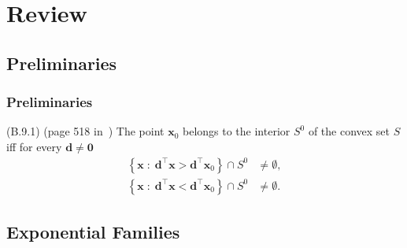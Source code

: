 \documentclass[serif,mathserif,professionalfont]{beamer}
\begin{document}
\section{Review}



\subsection{Preliminaries}



\begin{frame}
	
	\frametitle{Preliminaries}
	
	\begin{block}{(B.9.1) (page 518 in~\cite{BD2015})}
		The point $ \bm{x}_0 $ belongs to the interior $ S^0 $ of the convex set $ S $ iff for every $ \bm{d} \neq \bm{0} $
		\begin{equation*}
		\begin{split}
		\left\{\bm{x} \; : \; \bm{d}^\top \bm{x} > \bm{d}^\top \bm{x}_0 \right\} \cap S^0 & \neq \emptyset, \\
		\left\{\bm{x} \; : \; \bm{d}^\top \bm{x} < \bm{d}^\top \bm{x}_0 \right\} \cap S^0 & \neq \emptyset.
		\end{split}
		\end{equation*}
	\end{block}
	
\end{frame}






\subsection{Exponential Families}
\end{document}
